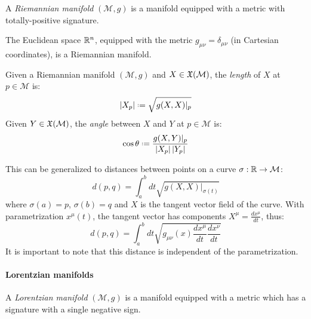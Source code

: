 \begin{definition}
  A \textit{Riemannian manifold} $ (\mathcal{M},g) $ is a manifold equipped with a metric with totally-positive signature.
\end{definition}

\begin{example}
  The Euclidean space $ \mathbb{R}^n $, equipped with the metric $ g_{\mu \nu} = \delta_{\mu \nu} $ (in Cartesian coordinates), is a Riemannian manifold.
\end{example}

\begin{definition}
  Given a Riemannian manifold $ (\mathcal{M},g) $ and $ X \in \mathfrak{X}(\mathcal{M}) $, the \textit{length} of $ X $ at $ p \in \mathcal{M} $ is:
  \begin{equation}
    \abs{X_p} \defeq \sqrt{g(X,X)\vert_p}
    \label{eq:3.3}
  \end{equation}
  Given $ Y \in \mathfrak{X}(\mathcal{M}) $, the \textit{angle} between $ X $ and $ Y $ at $ p \in \mathcal{M} $ is:
  \begin{equation}
    \cos \theta \defeq \frac{g(X,Y) \vert_p}{\abs{X_p} \abs{Y_p}}
    \label{eq:3.4}
  \end{equation}
\end{definition}

This can be generalized to distances between points on a curve $ \sigma : \mathcal{\mathbb{R}} \rightarrow \mathcal{M} $:
\begin{equation}
  d(p,q) = \int_a^b dt \sqrt{g(X,X)\vert_{\sigma(t)}}
  \label{eq:3.5}
\end{equation}
where $ \sigma(a) = p $, $ \sigma(b) = q $ and $ X $ is the tangent vector field of the curve. With parametrization $ x^{\mu}(t) $, the tangent vector has components $ X^{\mu} = \frac{dx^{\mu}}{dt} $, thus:
\begin{equation}
  d(p,q) = \int_a^b dt \sqrt{g_{\mu \nu}(x) \frac{dx^{\mu}}{dt} \frac{dx^{\nu}}{dt}}
  \label{eq:3.6}
\end{equation}
It is important to note that this distance is independent of the parametrization.

\paragraph{Lorentzian manifolds}

\begin{definition}
  A \textit{Lorentzian manifold} $ (\mathcal{M},g) $ is a manifold equipped with a metric which has a signature with a single negative sign.
\end{definition}

